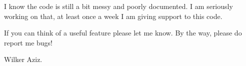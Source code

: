 

I know the code is still a bit messy and poorly documented. 
I am seriously working on that, at least once a week I am giving support to this code. 

If you can think of a useful feature please let me know. By the way, please do report me bugs!

\vspace{3cm}
\hspace{12cm}
Wilker Aziz.